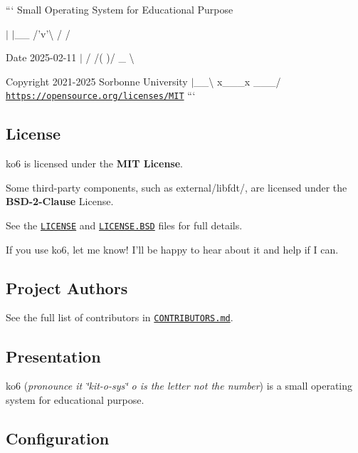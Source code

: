 ``` Small Operating System for Educational Purpose 

 $|$ $|$\-\_\-\-\_\- /'v'\textbackslash{} / / \begin{DoxyDate}{Date}
2025-\/02-\/11 $|$ / /( )/ \-\_\- \textbackslash{} 
\end{DoxyDate}
\begin{DoxyCopyright}{Copyright}
2021-\/2025 Sorbonne University $|$\-\_\-\-\_\-\textbackslash{} x\-\_\-\-\_\-\-\_\-x \-\_\-\-\_\-\-\_\-/ \href{https://opensource.org/licenses/MIT}{\tt https\-://opensource.\-org/licenses/\-M\-I\-T} ```
\end{DoxyCopyright}
\subsection*{License}


\begin{DoxyItemize}
\item ko6 is licensed under the {\bfseries M\-I\-T License}.
\item Some third-\/party components, such as {\ttfamily external/libfdt/}, are licensed under the {\bfseries B\-S\-D-\/2-\/\-Clause} License.
\item See the \href{./LICENSE}{\tt L\-I\-C\-E\-N\-S\-E} and \href{./src/soft/external/libfdt/LICENSE.BSD}{\tt L\-I\-C\-E\-N\-S\-E.\-B\-S\-D} files for full details.
\item If you use ko6, let me know! I'll be happy to hear about it and help if I can.
\end{DoxyItemize}

\subsection*{Project Authors}

See the full list of contributors in \href{./CONTRIBUTORS.md}{\tt C\-O\-N\-T\-R\-I\-B\-U\-T\-O\-R\-S.\-md}.

\subsection*{Presentation}

ko6 ({\itshape pronounce it \char`\"{}kit-\/o-\/sys\char`\"{} o is the letter not the number}) is a small operating system for educational purpose.

\subsection*{Configuration}

